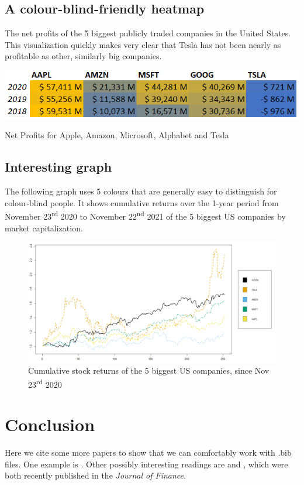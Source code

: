 \documentclass[titlepage]{article}
\begin{document}
\subsection{A colour-blind-friendly heatmap}
The net profits of the 5 biggest publicly traded companies in the United States. This visualization quickly makes very clear that Tesla has not been nearly as profitable as other, similarly big companies.
\bigbreak
\begin{table}[ht]
    \centering
    \includegraphics[scale=0.8]{heatmap.png}
        \caption{Net Profits for Apple, Amazon, Microsoft, Alphabet and Tesla }
\end{table}

\subsection{Interesting graph}
The following graph uses 5 colours that are generally easy to distinguish for colour-blind people. It shows cumulative returns over the 1-year period from November 23\textsuperscript{rd} 2020 to November 22\textsuperscript{nd} 2021 of the 5 biggest US companies by market capitalization.
 \begin{figure}[H]
   \includegraphics[scale=0.25]{cumreturns.png}
    \caption{Cumulative stock returns of the 5 biggest US companies, since Nov 23\textsuperscript{rd} 2020}
\end{figure}

\section{Conclusion}
Here we cite some more papers to show that we can comfortably work with .bib files. One example is \cite{Black1973}. Other possibly interesting readings are \cite{pursiainen2020cultural} and \cite{barras2020skill}, which were both recently published in the \textit{Journal of Finance}.

\newpage

\printbibliography
\end{document}
